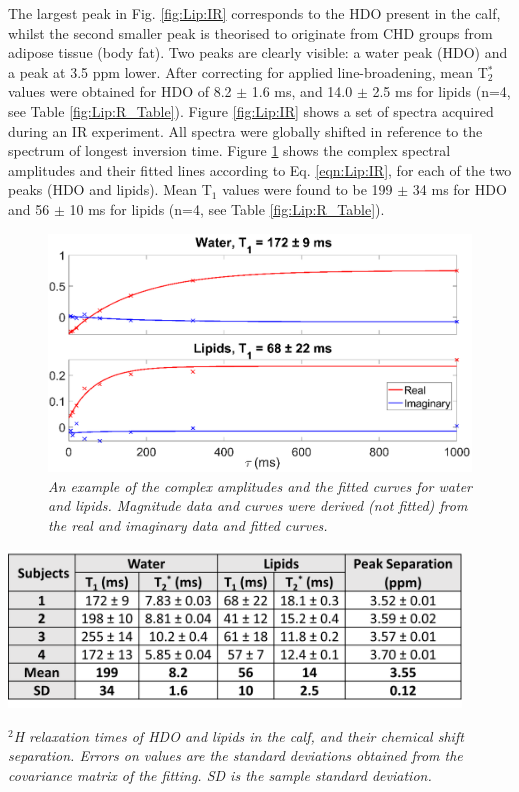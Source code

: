 The largest peak in Fig. \ref{fig:Lip:IR} corresponds to the HDO present in the calf, whilst the second smaller peak is theorised to originate from CHD groups from adipose tissue (body fat). Two peaks are clearly visible: a water peak (\ac{HDO}) and a peak at 3.5 ppm lower. After correcting for applied line-broadening, mean T$_2^*$ values were obtained for \ac{HDO} of 8.2 $\pm$ 1.6 ms, and 14.0 $\pm$ 2.5 ms for lipids (n=4, see Table \ref{fig:Lip:R_Table}). Figure \ref{fig:Lip:IR} shows a set of spectra acquired during an \ac{IR} experiment. All spectra were globally shifted in reference to the spectrum of longest inversion time. Figure \ref{fig:Lip:Amp_Tau} shows the complex spectral amplitudes and their fitted lines according to Eq. \ref{eqn:Lip:IR}, for each of the two peaks (\ac{HDO} and lipids). Mean T$_1$ values were found to be 199 $\pm$ 34 ms for \ac{HDO} and 56 $\pm$ 10 ms for lipids (n=4, see Table \ref{fig:Lip:R_Table}).

\begin{figure}
    \centering
    \includegraphics[width=1\textwidth]{Figures/Lipid/Amp_Tau.png}
    \caption{\textit{An example of the complex amplitudes and the fitted curves for water and lipids. Magnitude data and curves were derived (not fitted) from the real and imaginary data and fitted curves.}}
    \label{fig:Lip:Amp_Tau}
\end{figure}

\begin{table}
    \centering
    \includegraphics[width=0.9\textwidth]{Figures/Lipid/Relaxation_Table.png}
    \caption{\textit{$^2$H relaxation times of \ac{HDO} and lipids in the calf, and their chemical shift separation. Errors on values are the standard deviations obtained from the covariance matrix of the fitting. SD is the sample standard deviation.}}
    \label{fig:Lip:R_Table}
\end{table}

